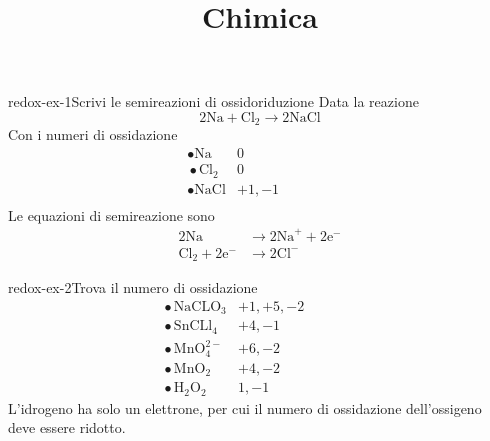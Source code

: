 \documentclass[preview]{standalone}
\begin{document}
\title{Chimica}
\genpage

\begin{snippetexercise}{redox-ex-1}{Scrivi le semireazioni di ossidoriduzione}
    Data la reazione
    \[
        2\text{Na} + \text{Cl}_2 \rightarrow 2\text{NaCl}
    \]
    Con i numeri di ossidazione
    \begin{align*}
        &\,\bullet \text{Na} & 0 &&&&&&\\
        &\,\bullet \text{Cl}_2 & 0 &&&&&&\\
        &\,\bullet \text{NaCl} & +1, -1 &&&&&&\\
    \end{align*}
    Le equazioni di semireazione sono
    \begin{align*}
        2\text{Na} &\rightarrow 2\text{Na}^+ + 2\text{e}^- \\
        \text{Cl}_2 + 2\text{e}^- &\rightarrow 2\text{Cl}^-
    \end{align*}
\end{snippetexercise}

\begin{snippetexercise}{redox-ex-2}{Trova il numero di ossidazione}
    \begin{align*}
        &\,\bullet \text{NaCLO}_3 & +1, +5, -2 &&&&&&\\
        &\,\bullet \text{SnCLl}_4 & +4, -1 &&&&&&\\
        &\,\bullet \text{MnO}_4^{2-} & +6, -2 &&&&&&\\
        &\,\bullet \text{MnO}_2 & +4, -2 &&&&&&\\
        &\,\bullet \text{H}_2\text{O}_2 & 1, -1&&&&&&
    \end{align*}
    L'idrogeno ha solo un elettrone, per cui il numero di ossidazione dell'ossigeno deve essere
    ridotto.
\end{snippetexercise}
\end{document}
